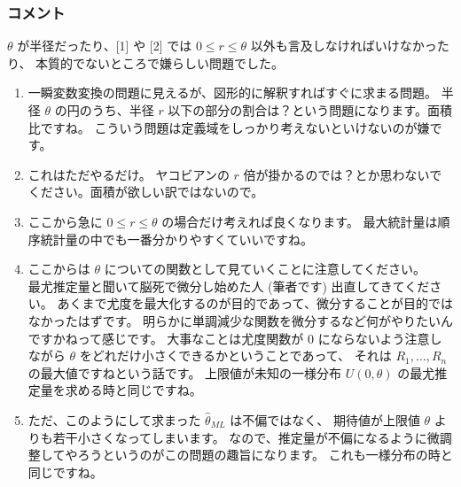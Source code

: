 \documentclass[./main.tex]{subfiles}
\begin{document}
    \subsubsection*{コメント}
    $\theta$ が半径だったり、[1] や [2] では $0 \leq r \leq \theta$ 以外も言及しなければいけなかったり、
    本質的でないところで嫌らしい問題でした。
    \begin{enumerate}
        \item 一瞬変数変換の問題に見えるが、図形的に解釈すればすぐに求まる問題。
        半径 $\theta$ の円のうち、半径 $r$ 以下の部分の割合は？という問題になります。面積比ですね。
        こういう問題は定義域をしっかり考えないといけないのが嫌です。%
        \item これはただやるだけ。
        ヤコビアンの $r$ 倍が掛かるのでは？とか思わないでください。面積が欲しい訳ではないので。
        \item ここから急に $0 \leq r \leq \theta$ の場合だけ考えれば良くなります。
        最大統計量は順序統計量の中でも一番分かりやすくていいですね。


        \item ここからは $\theta$ についての関数として見ていくことに注意してください。\\
        最尤推定量と聞いて脳死で微分し始めた人 (筆者です) 出直してきてください。
        あくまで尤度を最大化するのが目的であって、微分することが目的ではなかったはずです。
        明らかに単調減少な関数を微分するなど何がやりたいんですかねって感じです。
        大事なことは尤度関数が $0$ にならないよう注意しながら $\theta$ をどれだけ小さくできるかということであって、
        それは $R_1, \dots, R_n$ の最大値ですねという話です。
        上限値が未知の一様分布 $U(0, \theta)$ の最尤推定量を求める時と同じですね。

        \item ただ、このようにして求まった $\hat{\theta}_{ML}$ は不偏ではなく、
        期待値が上限値 $\theta$ よりも若干小さくなってしまいます。
        なので、推定量が不偏になるように微調整してやろうというのがこの問題の趣旨になります。
        これも一様分布の時と同じですね。
    \end{enumerate}
\end{document}
